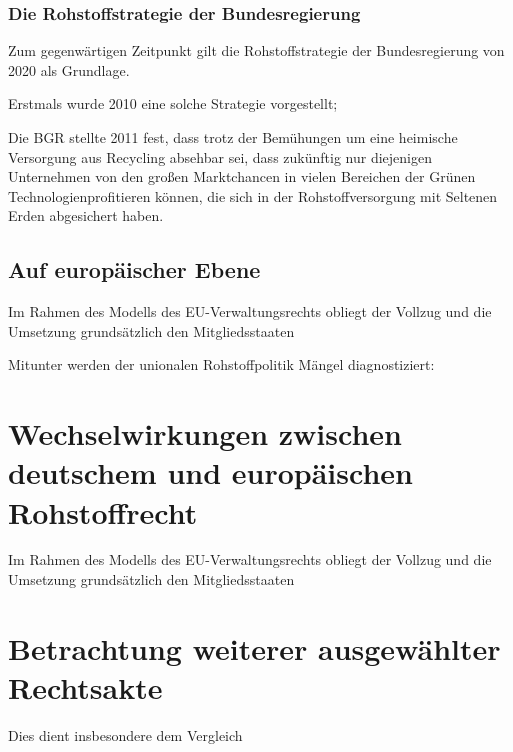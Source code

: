 \documentclass[12pt,a4paper,oneside]{book} %
\begin{document}
\subsubsection{Die Rohstoffstrategie der Bundesregierung}
Zum gegenwärtigen Zeitpunkt gilt die Rohstoffstrategie der Bundesregierung von 2020 als Grundlage.

Erstmals wurde 2010 eine solche Strategie vorgestellt;

Die BGR stellte 2011 fest, dass trotz der Bemühungen um eine heimische Versorgung aus Recycling absehbar sei, dass \glqq zukünftig nur diejenigen Unternehmen von den großen Marktchancen in vielen Bereichen der 	\glq Grünen Technologien\grq profitieren können, die sich in der Rohstoffversorgung mit Seltenen Erden abgesichert haben\grqq.\autocite{Top Commodity News 36, S. 8}

\subsection{Auf europäischer Ebene}

Im Rahmen des Modells des EU-Verwaltungsrechts obliegt der Vollzug und die Umsetzung grundsätzlich den Mitgliedsstaaten


Mitunter werden der unionalen Rohstoffpolitik Mängel diagnostiziert: 

\section{Wechselwirkungen zwischen deutschem und europäischen Rohstoffrecht}
Im Rahmen des Modells des EU-Verwaltungsrechts obliegt der Vollzug und die Umsetzung grundsätzlich den Mitgliedsstaaten

\section{Betrachtung weiterer ausgewählter Rechtsakte}

Dies dient insbesondere dem Vergleich 
\end{document}
